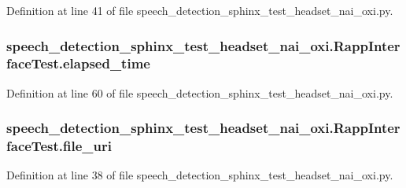 Definition at line 41 of file speech\-\_\-detection\-\_\-sphinx\-\_\-test\-\_\-headset\-\_\-nai\-\_\-oxi.\-py.

\hypertarget{classspeech__detection__sphinx__test__headset__nai__oxi_1_1RappInterfaceTest_a03824b184a2b8ab90a3c0e3e20ead5f0}{
\subsubsection[{elapsed\-\_\-time}]{\setlength{\rightskip}{0pt plus 5cm}speech\-\_\-detection\-\_\-sphinx\-\_\-test\-\_\-headset\-\_\-nai\-\_\-oxi.\-Rapp\-Interface\-Test.\-elapsed\-\_\-time}}\label{classspeech__detection__sphinx__test__headset__nai__oxi_1_1RappInterfaceTest_a03824b184a2b8ab90a3c0e3e20ead5f0}


Definition at line 60 of file speech\-\_\-detection\-\_\-sphinx\-\_\-test\-\_\-headset\-\_\-nai\-\_\-oxi.\-py.

\hypertarget{classspeech__detection__sphinx__test__headset__nai__oxi_1_1RappInterfaceTest_a5cc7fc98363103ddf448811c81666db4}{
\subsubsection[{file\-\_\-uri}]{\setlength{\rightskip}{0pt plus 5cm}speech\-\_\-detection\-\_\-sphinx\-\_\-test\-\_\-headset\-\_\-nai\-\_\-oxi.\-Rapp\-Interface\-Test.\-file\-\_\-uri}}\label{classspeech__detection__sphinx__test__headset__nai__oxi_1_1RappInterfaceTest_a5cc7fc98363103ddf448811c81666db4}


Definition at line 38 of file speech\-\_\-detection\-\_\-sphinx\-\_\-test\-\_\-headset\-\_\-nai\-\_\-oxi.\-py.

